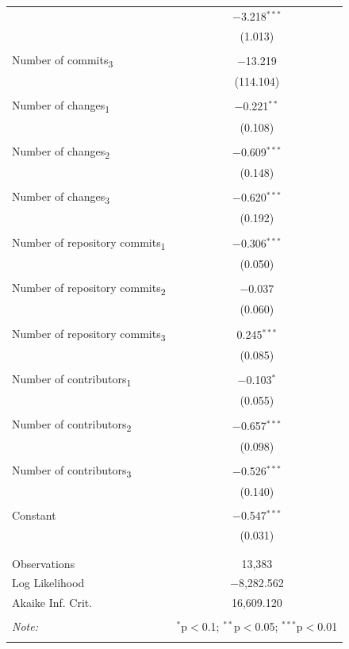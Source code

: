 \documentclass[12pt]{article}
\begin{document}
\begin{table}[!htbp]
\begin{tabular}{@{\extracolsep{5pt}}lc}
& $-$3.218$^{***}$ \\ 
& (1.013) \\ 
& \\ 
Number of commits\textsubscript{3}
& $-$13.219 \\ 
& (114.104) \\ 
& \\ 
Number of changes\textsubscript{1}
&
$-$0.221$^{**}$
\\ 
& (0.108) \\ 
& \\ 
Number of changes\textsubscript{2}
&
$-$0.609$^{***}$
\\ 
&
(0.148)
\\ 
& \\ 
Number of changes\textsubscript{3}
&
$-$0.620$^{***}$
\\ 
&
(0.192)
\\ 
&
\\ 
Number of repository commits\textsubscript{1}
&
$-$0.306$^{***}$
\\ 
&
(0.050)
\\ 
&
\\ 
Number of repository commits\textsubscript{2}
&
$-$0.037
\\ 
&
(0.060)
\\ 
&
\\ 
Number of repository commits\textsubscript{3}
&
0.245$^{***}$
\\ 
&
(0.085)
\\ 
&
\\ 
Number of contributors\textsubscript{1}
&
$-$0.103$^{*}$
\\ 
&
(0.055)
\\ 
&
\\ 
Number of contributors\textsubscript{2}
&
$-$0.657$^{***}$
\\ 
&
(0.098)
\\ 
&
\\ 
Number of contributors\textsubscript{3}
&
$-$0.526$^{***}$
\\ 
&
(0.140)
\\ 
&
\\ 
Constant
&
$-$0.547$^{***}$
\\ 
&
(0.031)
\\ 
&
\\ 
\hline
\\[-1.8ex] 
Observations
&
13,383
\\ 
Log
Likelihood
&
$-$8,282.562
\\ 
Akaike
Inf.
Crit.
&
16,609.120
\\ 
\hline 
\hline
\\[-1.8ex] 
\textit{Note:}
&
\multicolumn{1}{r}{$^{*}$p$<$0.1;
$^{**}$p$<$0.05;
$^{***}$p$<$0.01}
\\ 
\normalsize 
\end{tabular} 
\end{table} 
\end{document}
